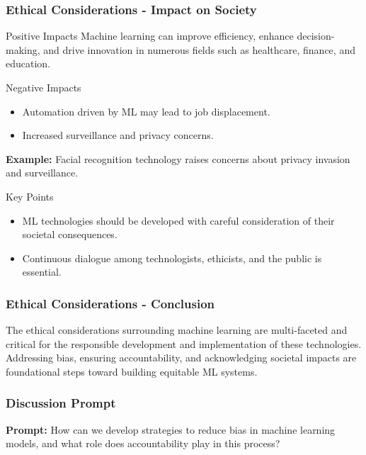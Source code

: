 \documentclass[aspectratio=169]{beamer}
\begin{document}
\begin{frame}[fragile]
    \frametitle{Ethical Considerations - Impact on Society}
    \begin{block}{Positive Impacts}
        Machine learning can improve efficiency, enhance decision-making, and drive innovation in numerous fields such as healthcare, finance, and education.
    \end{block}
    
    \begin{block}{Negative Impacts}
        \begin{itemize}
            \item Automation driven by ML may lead to job displacement.
            \item Increased surveillance and privacy concerns.
        \end{itemize}

        \item \textbf{Example:} Facial recognition technology raises concerns about privacy invasion and surveillance.
    \end{block}

    \begin{block}{Key Points}
        \begin{itemize}
            \item ML technologies should be developed with careful consideration of their societal consequences.
            \item Continuous dialogue among technologists, ethicists, and the public is essential.
        \end{itemize}
    \end{block}
\end{frame}

\begin{frame}[fragile]
    \frametitle{Ethical Considerations - Conclusion}
    The ethical considerations surrounding machine learning are multi-faceted and critical for the responsible development and implementation of these technologies. Addressing bias, ensuring accountability, and acknowledging societal impacts are foundational steps toward building equitable ML systems.
\end{frame}

\begin{frame}[fragile]
    \frametitle{Discussion Prompt}
    \textbf{Prompt:} How can we develop strategies to reduce bias in machine learning models, and what role does accountability play in this process?
\end{frame}
\end{document}
